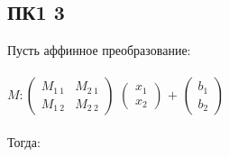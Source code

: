 	\subsection{ПК1 3}
		Пусть аффинное преобразование: \\ \\
		$M : \left( \begin{array}{cc}
		M_{1 \ 1} & M_{2 \ 1} \\
		M_{1 \ 2} & M_{2 \ 2}
		\end{array} \right)$
		$\left( \begin{array}{c}
		x_1 \\
		x_2
		\end{array} \right)$ $+$
		$\left( \begin{array}{c}
		b_1 \\
		b_2
		\end{array} \right)$ \\ \\
		Тогда:
		
